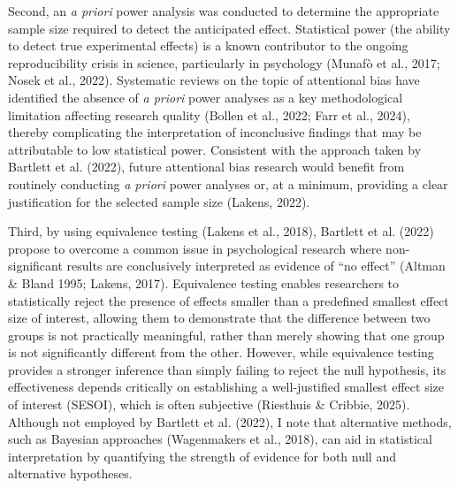 \documentclass[authordate, empirical]{jote-new-article}
\begin{document}
	Second, an \emph{a priori} power analysis was conducted to determine the appropriate sample size required to detect the anticipated effect. Statistical power (the ability to detect true experimental effects) is a known contributor to the ongoing reproducibility crisis in science, particularly in psychology (Munafò et al., 2017; Nosek et al., 2022). Systematic reviews on the topic of attentional bias have identified the absence of \emph{a priori} power analyses as a key methodological limitation affecting research quality (Bollen et al., 2022; Farr et al., 2024), thereby complicating the interpretation of inconclusive findings that may be attributable to low statistical power. Consistent with the approach taken by Bartlett et al. (2022), future attentional bias research would benefit from routinely conducting \emph{a priori} power analyses or, at a minimum, providing a clear justification for the selected sample size (Lakens, 2022).



	Third, by using equivalence testing (Lakens et al., 2018), Bartlett et al. (2022) propose to overcome a common issue in psychological research where non-significant results are conclusively interpreted as evidence of “no effect” (Altman \& Bland 1995; Lakens, 2017). Equivalence testing enables researchers to statistically reject the presence of effects smaller than a predefined smallest effect size of interest, allowing them to demonstrate that the difference between two groups is not practically meaningful, rather than merely showing that one group is not significantly different from the other. However, while equivalence testing provides a stronger inference than simply failing to reject the null hypothesis, its effectiveness depends critically on establishing a well-justified smallest effect size of interest (SESOI), which is often subjective (Riesthuis \& Cribbie, 2025). Although not employed by Bartlett et al. (2022), I note that alternative methods, such as Bayesian approaches (Wagenmakers et al., 2018), can aid in statistical interpretation by quantifying the strength of evidence for both null and alternative hypotheses.
\end{document}
